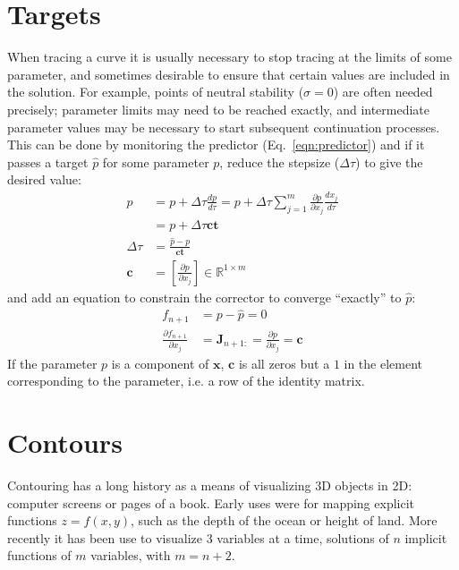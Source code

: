 \documentclass[10pt,openany,twoside]{book}
\numberwithin{equation}{section}   %
\newcommand{\Matrix}[1]{\boldsymbol{#1}}
\newcommand{\Vector}[1]{\boldsymbol{#1}}
\newcommand{\Eqn}[1]{Eq.\ \ref{#1}}
\newcommand{\Step}{\Delta\tau} %
\begin{document}
\section{Targets}\label{sect:targets}
When tracing a curve it is usually necessary to stop tracing at the limits
of some parameter, and sometimes desirable to ensure that
certain values are included in the solution.
For example,
points of neutral stability ($\sigma = 0$) are often needed precisely;
parameter limits may need to be reached exactly, and intermediate
parameter values may be necessary to start subsequent continuation processes.
This can be done by monitoring the predictor (\Eqn{eqn:predictor}) and
if it passes a target $\hat{p}$ for some parameter $p$, reduce the stepsize
($\Step$) to give the desired value:
\begin{align}
\hat{p} & = p + \Step \frac{dp}{d\tau}
	= p + \Step\sum_{j=1}^m \frac{\partial p}{\partial x_j}\frac{dx_j}{d\tau} \nonumber \\
	& = p + \Step \Vector{c} \Vector{t}  \nonumber \\
\Step & = \frac{\hat{p} - p}{\Vector{c}\Vector{t}} \nonumber \\
\Vector{c} & = \left[ \frac{\partial p}{\partial x_j} \right] 
\in \mathbb{R}^{1 \times m}
\end{align}
and add an equation to constrain the corrector to converge ``exactly''
to $\hat{p}$:
\begin{align}
f_{n+1} & = p - \hat{p} = 0  \nonumber \\
\frac{\partial f_{n+1}}{\partial x_j} & = \Matrix{J}_{n+1:} = \frac{\partial p}{\partial x_j}
	= \Vector{c}
\end{align}
If the parameter $p$ is a component of $\Vector{x}$, $\Vector{c}$ is all zeros
but a $1$ in the element corresponding to the parameter, i.e. a row of the identity matrix.

\section{Contours}\label{sect:contours}
Contouring has a long history as a means of visualizing 3D objects in
2D: computer screens or pages of a book. Early uses were for mapping
explicit functions $z = f(x,y)$, such as the depth of the ocean or
height of land.
More recently it has been use to visualize 3 variables at a time,
solutions of $n$ implicit functions of $m$ variables, with $m = n+2$.
\end{document}
